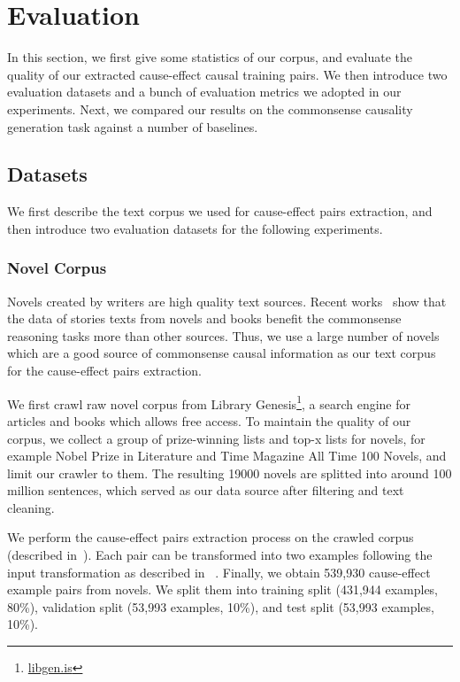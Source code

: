 \section{Evaluation}
\label{sec:eval}
In this section, we first give some statistics of our 
corpus, and evaluate the quality of our extracted 
cause-effect causal training pairs.
We then introduce two evaluation datasets and 
a bunch of evaluation metrics we adopted in our experiments. 
Next, we compared our results on the commonsense causality generation task against a number of baselines. 

\subsection{Datasets}
\label{sec:datasets}
We first describe the text corpus we used for 
cause-effect pairs extraction, and then introduce
two evaluation datasets for the following experiments.

\subsubsection{Novel Corpus}
\label{sec:novel_corpus}
Novels created by writers are high quality text sources.
Recent works~\cite{gordon2011commonsense, trinh2018simple} show that the data of stories texts from novels and books benefit the commonsense reasoning tasks more than other sources.
Thus, we use a large number of novels 
which are a good source of commonsense causal information as our text corpus for the cause-effect pairs extraction. 

We first crawl raw novel corpus from Library Genesis\footnote{\url{libgen.is}}, a search engine for articles and books which allows free access. 
To maintain the quality of our corpus, we collect a group of prize-winning lists and top-x lists for novels, for example Nobel Prize in Literature and Time Magazine All Time 100 Novels, and limit our crawler to them. The resulting 19000 novels are splitted into around 100 million sentences, which served as our data source after filtering and text cleaning. 

We perform the cause-effect pairs extraction process on
the crawled corpus (described 
in~). 
Each pair can be transformed into two examples
following the input transformation as described in ~. 
Finally, we obtain 539,930 cause-effect example pairs from novels. We split them into training split (431,944 examples, 80\%), validation split (53,993 examples, 10\%),
and test split (53,993 examples, 10\%).


